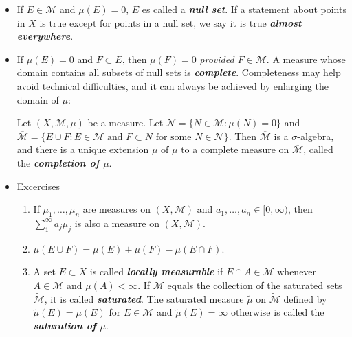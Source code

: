 \documentclass{article}
\theoremstyle{definition}
\numberwithin{equation}{section}
\begin{document}
\begin{itemize}
\begin{thm}
\begin{enumerate}
			\end{enumerate}
		\end{thm}
		\item If $E\in\mathcal{M}$ and $\mu(E)=0$, $E$ es called a \textbf{\textit{null set}}. If a statement about points in $X$ is true except for points in a null set, we say it is true \textbf{\textit{almost everywhere}}.
		\item If $\mu(E)=0$ and $F\subset E$, then $\mu(F)=0$ \textit{provided $F\in\mathcal{M}$}. A measure whose domain contains all subsets of null sets is \textbf{\textit{complete}}. Completeness may help avoid technical difficulties, and it can always be achieved by enlarging the domain of $\mu$:
		\begin{thm}
			Let $(X,\mathcal{M},\mu)$ be a measure. Let $\mathcal{N}=\{N\in\mathcal{M}:\mu(N)=0\}$ and $\overline{\mathcal{M}}=\{E\cup F:E\in\mathcal{M}\text{ and }F\subset N\text{ for some }N\in\mathcal{N}\}$. Then $\overline{\mathcal{M}}$ is a $\sigma$-algebra, and there is a unique extension $\bar{\mu}$ of $\mu$ to a complete measure on $\overline{\mathcal{M}}$, called the \textbf{\textit{completion of $\mu$}}.
		\end{thm}
		\item Excercises
		\begin{enumerate}
			\item If $\mu_1,\ldots,\mu_n$ are measures on $(X,\mathcal{M})$ and $a_1,\ldots,a_n\in[0,\infty)$, then $\sum_1^\infty a_j\mu_j$ is also a measure on $(X,\mathcal{M})$.
			\item $\mu(E\cup F)=\mu(E)+\mu(F)-\mu(E\cap F)$.
			\item A set $E\subset X$ is called \textbf{\textit{locally measurable}} if $E\cap A\in\mathcal{M}$ whenever $A\in \mathcal{M}$ and $\mu(A)<\infty$. If $\mathcal{M}$ equals the collection of the saturated sets $\tilde{\mathcal{M}}$, it is called \textbf{\textit{saturated}}. The saturated measure $\tilde{\mu}$ on $\tilde{\mathcal{M}}$ defined by $\tilde{\mu}(E)=\mu(E)$ for $E\in \mathcal{M}$ and $\tilde{\mu}(E)=\infty$ otherwise is called the \textbf{\textit{saturation of $\mu$}}.	
		\end{enumerate}
	\end{itemize}
	
\end{document}
